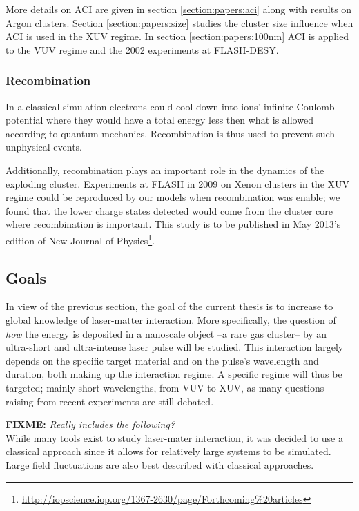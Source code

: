 More details on ACI are given in section \ref{section:papers:aci} along with
results on Argon clusters. Section \ref{section:papers:size} studies the cluster
size influence when ACI is used in the XUV regime. In section
\ref{section:papers:100nm} ACI is applied to the VUV regime and the
2002 experiments at FLASH-DESY.

\subsubsection{Recombination}
In a classical simulation electrons could cool down into ions' infinite Coulomb
potential where they would have a total energy less then what is allowed
according to quantum mechanics. Recombination is thus used to prevent such
unphysical events.

Additionally, recombination plays an important role in the dynamics of the
exploding cluster. Experiments at FLASH in 2009 on Xenon clusters in the XUV
regime\cite{Thomas2009} could be reproduced by our models when recombination
was enable; we found that the lower charge states detected would come from the
cluster core where recombination is important. This study is to be published in
May 2013's edition of New Journal of
Physics\footnote{\url{http://iopscience.iop.org/1367-2630/page/Forthcoming\%20articles}}.


\subsection{Goals}

In view of the previous section, the goal of the current thesis is to increase
to global knowledge of laser-matter interaction. More specifically, the
question of \textit{how} the energy is deposited in a nanoscale object
--a rare gas cluster-- by an
ultra-short and ultra-intense laser pulse will be studied. This interaction
largely depends on the specific target material and on the pulse's wavelength
and duration, both making up the interaction regime. A specific regime will
thus be targeted; mainly short wavelengths, from VUV to XUV, as many questions
raising from recent experiments are still debated.

\textbf{FIXME:} \textit{Really includes the following?}\\
While many tools exist to study laser-mater interaction, it was decided to use
a classical approach since it allows for relatively large systems to be
simulated. Large field fluctuations are also best described with
classical approaches\cite{Fennel2010}.

